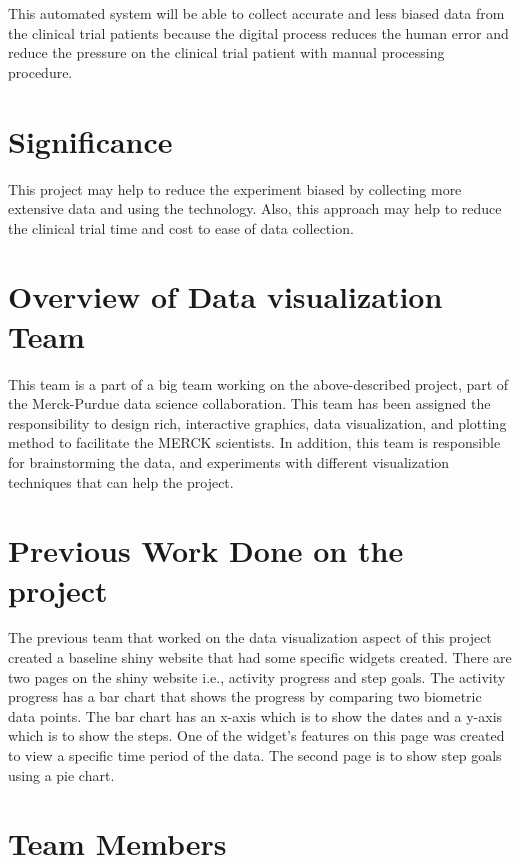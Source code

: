 \documentclass[]{book}
\begin{document}
This automated system will be able to collect accurate and less biased
data from the clinical trial patients because the digital process
reduces the human error and reduce the pressure on the clinical trial
patient with manual processing procedure.

\section{Significance}\label{significance}

This project may help to reduce the experiment biased by collecting more
extensive data and using the technology. Also, this approach may help to
reduce the clinical trial time and cost to ease of data collection.

\section{Overview of Data visualization
Team}\label{overview-of-data-visualization-team}

This team is a part of a big team working on the above-described
project, part of the Merck-Purdue data science collaboration. This team
has been assigned the responsibility to design rich, interactive
graphics, data visualization, and plotting method to facilitate the
MERCK scientists. In addition, this team is responsible for
brainstorming the data, and experiments with different visualization
techniques that can help the project.

\section{Previous Work Done on the
project}\label{previous-work-done-on-the-project}

The previous team that worked on the data visualization aspect of this
project created a baseline shiny website that had some specific widgets
created. There are two pages on the shiny website i.e., activity
progress and step goals. The activity progress has a bar chart that
shows the progress by comparing two biometric data points. The bar chart
has an x-axis which is to show the dates and a y-axis which is to show
the steps. One of the widget's features on this page was created to view
a specific time period of the data. The second page is to show step
goals using a pie chart.

\section{Team Members}\label{team-members}
\end{document}
